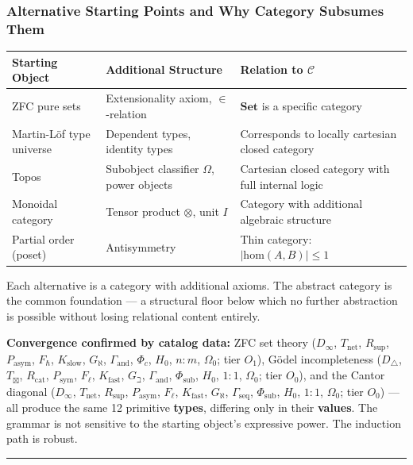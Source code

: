 \documentclass[12pt,a4paper]{article}
\begin{document}
\subsubsection{Alternative Starting Points and Why Category Subsumes Them}

\begin{table}[htbp]
\centering
\small
{}
\begin{tabularx}{\textwidth}{>{\centering\arraybackslash}X >{\centering\arraybackslash}X >{\centering\arraybackslash}X}
\toprule
\rowcolor{gray!25}\textbf{Starting Object} & \textbf{Additional Structure} & \textbf{Relation to $\mathcal{C}$} \\
\midrule
\rowcolors{1}{white}{gray!10}
ZFC pure sets & Extensionality axiom, $\in$-relation & $\mathbf{Set}$ is a specific category \\
Martin-L\"of type universe & Dependent types, identity types & Corresponds to locally cartesian closed category \\
Topos & Subobject classifier $\Omega$, power objects & Cartesian closed category with full internal logic \\
Monoidal category & Tensor product $\otimes$, unit $I$ & Category with additional algebraic structure \\
Partial order (poset) & Antisymmetry & Thin category: $|\text{hom}(A,B)| \leq 1$ \\
\bottomrule
\end{tabularx}
\end{table}

Each alternative is a category with additional axioms. The abstract category is the common foundation --- a structural floor below which no further abstraction is possible without losing relational content entirely.

\textbf{Convergence confirmed by catalog data:} ZFC set theory ($D_\infty$, $T_\text{net}$, $R_\text{sup}$, $P_\text{asym}$, $F_\hbar$, $K_\text{slow}$, $G_\aleph$, $\Gamma_\text{and}$, $\Phi_c$, $H_0$, $n{:}m$, $\Omega_0$; tier $O_1$), G\"odel incompleteness ($D_\triangle$, $T_\boxtimes$, $R_\text{cat}$, $P_\text{sym}$, $F_\ell$, $K_\text{fast}$, $G_\beth$, $\Gamma_\text{and}$, $\Phi_\text{sub}$, $H_0$, $1{:}1$, $\Omega_0$; tier $O_0$), and the Cantor diagonal ($D_\infty$, $T_\text{net}$, $R_\text{sup}$, $P_\text{asym}$, $F_\ell$, $K_\text{fast}$, $G_\aleph$, $\Gamma_\text{seq}$, $\Phi_\text{sub}$, $H_0$, $1{:}1$, $\Omega_0$; tier $O_0$) --- all produce the same 12 primitive \textbf{types}, differing only in their \textbf{values}. The grammar is not sensitive to the starting object's expressive power. The induction path is robust.\begin{center}
\rule{0.5\textwidth}{0.4pt}
\end{center}
\end{document}
